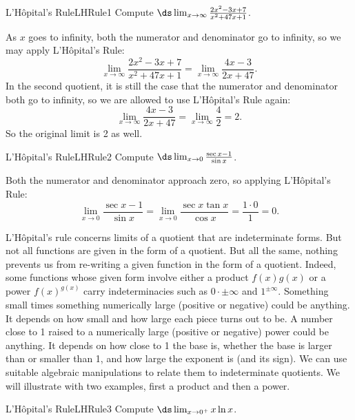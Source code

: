 \begin{example}{L'H\^opital's Rule}{LHRule1}
Compute $\ds\lim_{x\to \infty}{2x^2-3x+7\over
x^2+47x+1}$.
\end{example}

\begin{solution} 
As $x$ goes to infinity, both the numerator and denominator go to
infinity, so we may apply L'H\^opital's Rule:
$$\lim_{x\to \infty}\frac{2x^2-3x+7}{x^2+47x+1}=
\lim_{x\to \infty}\frac{4x-3}{2x+47}.$$
In the second quotient, it is still the case that the numerator and
denominator both go to infinity, so we are allowed to use
L'H\^opital's Rule again:
$$\lim_{x\to \infty}\frac{4x-3}{2x+47}=\lim_{x\to \infty}\frac{4}{2}=2.$$
So the original limit is 2 as well.
\end{solution}

\begin{example} {L'H\^opital's Rule}{LHRule2}
Compute $\ds\lim_{x\to 0}\frac{\sec x - 1}{\sin x}$.
\end{example}

\begin{solution} 
Both the numerator and denominator approach zero, so applying 
L'H\^opital's Rule:
$$\lim_{x\to 0}\frac{\sec x - 1}{\sin x}=
\lim_{x\to 0}\frac{\sec x\tan x}{\cos x}=\frac{1\cdot 0}{1}=0.$$
\end{solution}

L'H\^{o}pital's rule concerns limits of a quotient that are indeterminate forms. But not all
functions are given in the form of a quotient. But all the same, nothing
prevents us from re-writing a given function in the form of a quotient.
Indeed, some functions whose given form involve either a product $f\left(
x\right) g\left( x\right) $ or a power $f\left( x\right) ^{g\left( x\right)
} $ carry indeterminacies such as $0\cdot \pm \infty $ and $1^{\pm \infty }.$
Something small times something numerically large (positive or negative)
could be anything. It depends on how small and how large each piece turns
out to be. A number close to 1 raised to a numerically large (positive or
negative) power could be anything. It depends on how close to 1 the base is,
whether the base is larger than or smaller than 1, and how large the
exponent is (and its sign). We can use suitable algebraic manipulations to
relate them to indeterminate quotients. We will illustrate with two
examples, first a product and then a power.

\begin{example}{L'H\^opital's Rule}{LHRule3}
Compute $\ds\lim_{x\to 0^+} x\ln x$.
\end{example}

